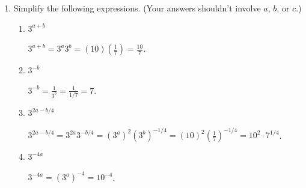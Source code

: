 \documentclass{article}
\begin{document}
\begin{enumerate}[resume]
\begin{enumerate}
    \begin{itemize}
    \item $a$ is between $\fitb{0.25in}{2}$ and $\fitb{0.25in}{3}$.
    \item $b$ is between $\fitb{0.25in}{-2}$ and $\fitb{0.25in}{-1}$.
    \end{itemize}

    \pspace{\vfill}

  \item
    Simplify the following expressions. (Your answers shouldn't involve $a$, $b$, or $c$.)

    \begin{enumerate}
    \item
      \begin{problem}[\vfill]
        $3^{a + b}$
      \end{problem}

      \begin{solution}
        $3^{a+b} = 3^a 3^b = (10)(\frac{1}{7}) = \frac{10}{7}$.
      \end{solution}

    \item
      \begin{problem}[\vfill]
        $3^{-b}$
      \end{problem}

      \begin{solution}
        $3^{-b} = \frac{1}{3^b} = \frac{1}{1/7} = 7$.
      \end{solution}

    \item
      \begin{problem}[\vfill]
        $3^{2a - b / 4}$
      \end{problem}

      \begin{solution}
        $3^{2a-b/4} = 3^{2a}3^{-b/4} = (3^a)^2(3^b)^{-1/4}=(10)^2(\frac{1}{7})^{-1/4}
        =10^2\cdot 7^{1/4}$.
      \end{solution}

    \item
      \begin{problem}[\vfill]
        $3^{-4a}$
      \end{problem}

      \begin{solution}
        $3^{-4a}=(3^a)^{-4} = 10^{-4}$.
      \end{solution}

    \end{enumerate}

  \end{enumerate}

\end{enumerate}
\end{document}
